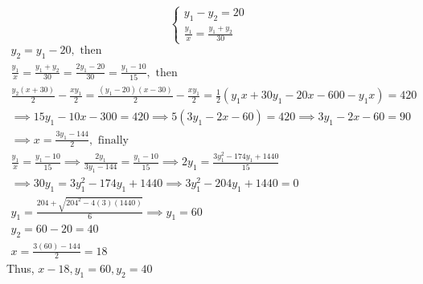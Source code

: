 \documentclass[12pt]{article}
\begin{document}
\begin{enumerate}
\begin{equation*}
\begin{cases}
            y_1-y_2=20 \\
            \displaystyle\frac{y_1}{x} = \displaystyle\frac{y_1+y_2}{30}
        \end{cases}    
        \end{equation*}
    \begin{gather*}
        y_2=y_1-20, \text{ then} \\
        \frac{y_1}{x}=\frac{y_1+y_2}{30}=\frac{2y_1-20}{30}=\frac{y_1-10}{15}, \text{ then} \\
        \frac{y_2(x+30)}{2}-\frac{xy_1}{2}=\frac{(y_1-20)(x-30)}{2}-\frac{xy_1}{2}=\frac{1}{2}{(y_1x+30y_1-20x-600-y_1x)}=420 \\
        \implies 15y_1-10x-300=420 \implies 5(3y_1-2x-60)=420 \implies 3y_1-2x-60=90 \\
        \implies x=\frac{3y_1-144}{2}, \text{ finally} \\
        \frac{y_1}{x}=\frac{y_1-10}{15} \implies \frac{2y_1}{3y_1-144}=\frac{y_1-10}{15} \implies 2y_1=\frac{3y_1^2-174y_1+1440}{15} \\
        \implies 30y_1=3y_1^2-174y_1+1440 \implies 3y_1^2-204y_1+1440=0 \\
        y_1=\frac{204+\sqrt{204^2-4(3)(1440)}}{6} \implies y_1=60\\
        y_2=60-20=40 \\
        x=\frac{3(60)-144}{2}=18
    \end{gather*}
    Thus, $x-18, y_1=60, y_2=40$
\end{enumerate}
\end{document}

